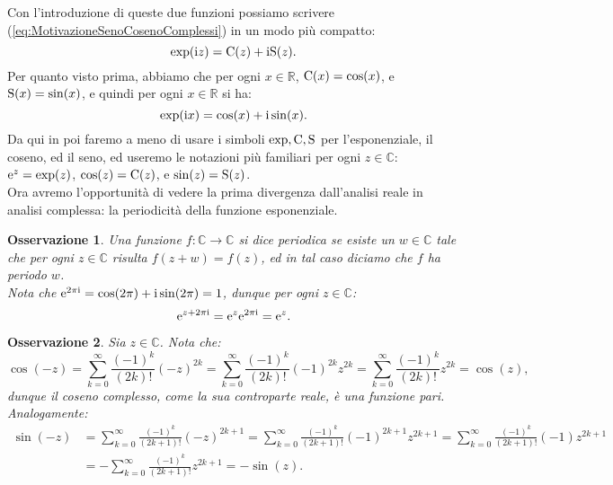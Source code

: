 \documentclass[11pt]{book}
\theoremstyle{Definizione}
\theoremstyle{TeoremaProposizioneLemmaCorollarioCongettura}
\theoremstyle{OsservazioneNotaEsempio}
\newtheorem{myobs}{Osservazione}[section]
\newcommand{\R}{\mathbb{R}}
\newcommand{\C}{\mathbb{C}}
\newcommand{\Cos}{\textup{C}}
\newcommand{\Sin}{\textup{S}}
\renewcommand{\i}{\textup{i}}
\newcommand{\e}{\textup{e}}
\begin{document}
\noindent
Con l'introduzione di queste due funzioni possiamo scrivere (\ref{eq:MotivazioneSenoCosenoComplessi}) in un modo più compatto:
\begin{equation}\label{eq:FormulaEuleroFormaGeneraleCosSin}
\exp(\i z) = \Cos(z)+\i\Sin(z).
\end{equation}
Per quanto visto prima, abbiamo che per ogni $x\in \R$, $\Cos(x) = \cos(x)$, e $\Sin(x) = \sin(x)$, e quindi per ogni $x \in \R$ si ha:
\begin{equation}\label{eq:FormulaEuleroRealiExp}
\exp(\i x) = \cos(x)+\i\sin(x).
\end{equation}
Da qui in poi faremo a meno di usare i simboli $\exp,\Cos,\Sin$ per l'esponenziale, il coseno, ed il seno, ed useremo le notazioni più familiari per ogni $z\in \C$: $\e^z = \exp(z)$, $\cos(z) = \Cos(z)$, e $\sin(z) = \Sin(z)$.\\
Ora avremo l'opportunità di vedere la prima divergenza dall'analisi reale in analisi complessa: la periodicità della funzione esponenziale.
\begin{myobs}
Una funzione $f:\C \longrightarrow \C$ si dice periodica se esiste un $w\in \C$ tale che per ogni $z\in \C$ risulta $f(z+w) = f(z)$, ed in tal caso diciamo che $f$ ha periodo $w$.\\
Nota che $\e^{2\pi \i} = \cos(2\pi) + \i \sin(2\pi) = 1$, dunque per ogni $z\in \C$:
$$
\e^{z+2\pi \i} = \e^z \e^{2\pi \i} = \e^z.
$$
\end{myobs}
\begin{myobs}
Sia $z\in \C$. Nota che:
$$
\cos(-z) = \sum_{k = 0}^\infty \frac{(-1)^k}{(2k)!}(-z)^{2k} = \sum_{k = 0}^\infty \frac{(-1)^k}{(2k)!}(-1)^{2k}z^{2k} = \sum_{k = 0}^\infty \frac{(-1)^k}{(2k)!}z^{2k} = \cos(z),
$$
dunque il coseno complesso, come la sua controparte reale, è una funzione pari. Analogamente:
\begin{align*}
\sin(-z) &= \sum_{k = 0}^\infty \frac{(-1)^k}{(2k+1)!}(-z)^{2k+1} = \sum_{k = 0}^\infty \frac{(-1)^k}{(2k+1)!}(-1)^{2k+1}z^{2k+1} = \sum_{k = 0}^\infty \frac{(-1)^k}{(2k+1)!}(-1)z^{2k+1} \\
&= - \sum_{k = 0}^\infty \frac{(-1)^k}{(2k+1)!}z^{2k+1} = -\sin(z).
\end{align*}
\end{myobs}
\end{document}
